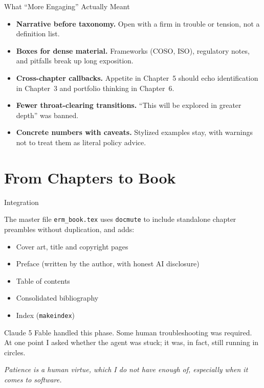 \documentclass[aspectratio=169]{beamer}
\begin{document}
\begin{frame}{What ``More Engaging'' Actually Meant}

\begin{itemize}\setlength\itemsep{0.8em}
  \item \textbf{Narrative before taxonomy.}
        Open with a firm in trouble or tension, not a definition list.
  \item \textbf{Boxes for dense material.}
        Frameworks (COSO, ISO), regulatory notes, and pitfalls break up
        long exposition.
  \item \textbf{Cross-chapter callbacks.}
        Appetite in Chapter~5 should echo identification in Chapter~3 and
        portfolio thinking in Chapter~6.
  \item \textbf{Fewer throat-clearing transitions.}
        ``This will be explored in greater depth'' was banned.
  \item \textbf{Concrete numbers with caveats.}
        Stylized examples stay, with warnings not to treat them as literal
        policy advice.
\end{itemize}

\end{frame}

\section{From Chapters to Book}

\begin{frame}{Integration}

The master file \texttt{erm\_book.tex} uses \texttt{docmute} to include
standalone chapter preambles without duplication, and adds:

\begin{itemize}\setlength\itemsep{0.6em}
  \item Cover art, title and copyright pages
  \item Preface (written by the author, with honest AI disclosure)
  \item Table of contents
  \item Consolidated bibliography
  \item Index (\texttt{makeindex})
\end{itemize}

\bigskip
Claude 5 Fable handled this phase. Some human troubleshooting was required.
At one point I asked whether the agent was stuck; it was, in fact, still
running in circles.

\bigskip
\textit{Patience is a human virtue, which I do not have enough of,
especially when it comes to software.}

\end{frame}
\end{document}
